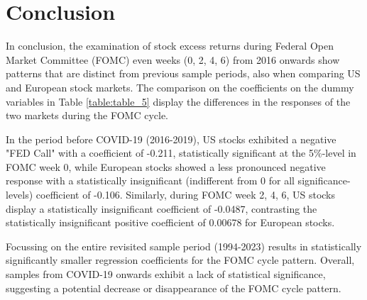 



%

\chapter{Conclusion}
In conclusion, the examination of stock excess returns during Federal Open Market Committee (FOMC) even weeks (0, 2, 4, 6) from 2016 onwards show patterns that are distinct from previous sample periods, also when comparing US and European stock markets. The comparison on the coefficients on the dummy variables in Table \ref{table:table_5} display the differences in the responses of the two markets during the FOMC cycle.  

In the period before COVID-19 (2016-2019),  US stocks exhibited a negative "FED Call" with a coefficient of -0.211, statistically significant at the 5\%-level in FOMC week 0, while European stocks showed a less pronounced negative response with a statistically insignificant (indifferent from 0 for all significance-levels) coefficient of -0.106. Similarly, during FOMC week 2, 4, 6, US stocks display a statistically insignificant coefficient of -0.0487,  contrasting the statistically insignificant positive coefficient of 0.00678 for European stocks. 

Focussing on the entire revisited sample period (1994-2023) results in statistically significantly smaller regression coefficients for the FOMC cycle pattern.  Overall, samples from COVID-19 onwards exhibit a lack of statistical significance,  suggesting a potential decrease or disappearance of the FOMC cycle pattern.




